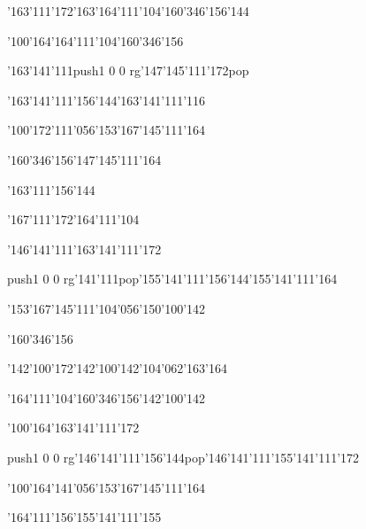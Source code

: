 \null\vfill\ipa\centerline{\enskip\char'163\char'111\char'172\enskip\char'163\char'164\char'111\char'104\enskip\enskip\enskip\enskip\enskip\char'160\char'346\char'156\char'144}\medskip\centerline{\enskip\enskip\enskip\enskip\enskip\char'100\char'164\enskip\char'164\char'111\char'104\enskip\char'160\char'346\char'156}\medskip\centerline{\enskip\enskip\enskip\enskip\enskip\enskip\enskip\enskip\enskip\enskip\char'163\char'141\char'111\enskip\pdfcolorstack\match push{1 0 0 rg}\char'147\char'145\char'111\char'172\pdfcolorstack\match pop{}}\medskip\centerline{\enskip\enskip\enskip\enskip\char'163\char'141\char'111\char'156\char'144\enskip\enskip\enskip\enskip\enskip\char'163\char'141\char'111\char'116}\medskip\centerline{\enskip\char'100\char'172\enskip\enskip\enskip\char'111\char'056\char'153\char'167\char'145\char'111\char'164\enskip\enskip\enskip\enskip}\medskip\centerline{\enskip\char'160\char'346\char'156\enskip\enskip\enskip\enskip\char'147\char'145\char'111\char'164}\medskip\vfill\footline{\hfil\tt\folio\hfil}\eject
\null\vfill\ipa\centerline{\enskip\enskip\enskip\enskip\enskip\enskip\enskip\enskip\enskip\enskip\enskip\enskip\enskip\char'163\char'111\char'156\char'144}\medskip\centerline{\enskip\char'167\char'111\char'172\enskip\enskip\enskip\enskip\enskip\enskip\enskip\enskip\char'164\char'111\char'104}\medskip\centerline{\enskip\enskip\enskip\enskip\enskip\enskip\enskip\enskip\enskip\enskip\char'146\char'141\char'111\enskip\char'163\char'141\char'111\char'172}\medskip\centerline{\enskip\pdfcolorstack\match push{1 0 0 rg}\char'141\char'111\pdfcolorstack\match pop{}\enskip\char'155\char'141\char'111\char'156\char'144\enskip\enskip\enskip\enskip\enskip\char'155\char'141\char'111\char'164}\medskip\centerline{\enskip\enskip\enskip\enskip\enskip\enskip\enskip\char'153\char'167\char'145\char'111\char'104\char'056\char'150\char'100\char'142}\medskip\centerline{\enskip\char'160\char'346\char'156\enskip\enskip\enskip\enskip\enskip\enskip\enskip\enskip}\medskip\vfill\footline{\hfil\tt\folio\hfil}\eject
\null\vfill\ipa\centerline{\enskip\char'142\char'100\char'172\enskip\enskip\enskip\enskip\enskip\char'142\char'100\char'142\enskip\char'104\char'062\char'163\char'164}\medskip\centerline{\enskip\char'164\char'111\char'104\enskip\enskip\enskip\enskip\char'160\char'346\char'156\enskip\char'142\char'100\char'142}\medskip\centerline{\enskip\char'100\char'164\enskip\enskip\enskip\enskip\enskip\enskip\enskip\enskip\enskip\enskip\enskip\enskip\char'163\char'141\char'111\char'172}\medskip\centerline{\enskip\enskip\enskip\enskip\pdfcolorstack\match push{1 0 0 rg}\char'146\char'141\char'111\char'156\char'144\pdfcolorstack\match pop{}\enskip\char'146\char'141\char'111\enskip\char'155\char'141\char'111\char'172}\medskip\centerline{\enskip\char'100\char'164\enskip\enskip\enskip\char'141\char'056\char'153\char'167\char'145\char'111\char'164\enskip\enskip\enskip\enskip}\medskip\centerline{\enskip\char'164\char'111\char'156\enskip\enskip\enskip\enskip\char'155\char'141\char'111\char'155}\medskip\vfill\footline{\hfil\tt\folio\hfil}\eject
